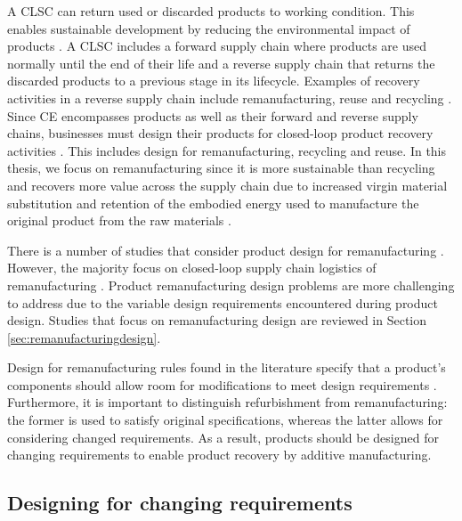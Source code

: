 A \ac{CLSC} can return used or discarded products to working condition. This enables sustainable development by reducing the environmental impact of products \cite{QuariguasiFrotaNeto2010}. A \ac{CLSC} includes a forward supply chain where products are used normally until the end of their life and a reverse supply chain that returns the discarded products to a previous stage in its lifecycle. Examples of recovery activities in a reverse supply chain include remanufacturing, reuse and recycling \cite{Lieder2016,MacArthur2012}. Since \ac{CE} encompasses products as well as their forward and reverse supply chains, businesses must design their products for closed-loop product recovery activities \cite{Lieder2016}. This includes design for remanufacturing, recycling and reuse. In this thesis, we focus on remanufacturing since it is more sustainable than recycling and recovers more value across the supply chain due to increased virgin material substitution and retention of the embodied energy used to manufacture the original product from the raw materials \cite{MacArthur2012,Goodall2014}. 

There is a number of studies that consider product design for remanufacturing \cite{Ijomah2010,Liu2017}. However, the majority focus on closed-loop supply chain logistics of remanufacturing \cite{Mahadevan,Golinska2015,VanThao2015,Song2005,Koren2018}. Product remanufacturing design problems are more challenging to address due to the variable design requirements encountered during product design. Studies that focus on remanufacturing design are reviewed in Section \ref{sec:remanufacturingdesign}. 

Design for remanufacturing rules found in the literature specify that a product's components should allow room for modifications to meet design requirements \cite{Ijomah2009}. Furthermore, it is important to distinguish refurbishment from remanufacturing: the former is used to satisfy original specifications, whereas the latter allows for considering changed requirements. As a result, products should be designed for changing requirements to enable product recovery by additive manufacturing.

\subsection{Designing for changing requirements} \label{subsec:changingreq}

